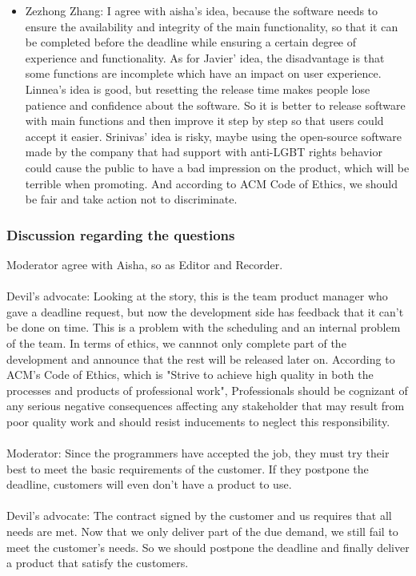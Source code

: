\begin{itemize}
  			\item Zezhong Zhang: I agree with aisha's idea, because the software needs to ensure the availability and integrity of the main functionality, so that it can be completed before the deadline while ensuring a certain degree of experience and functionality. As for Javier' idea, the disadvantage is that some functions are incomplete which have an impact on user experience. Linnea's idea is good, but resetting the release time makes people lose patience and confidence about the software. So it is better to release software with main functions and then improve it step by step so that users could accept it easier. Srinivas' idea is risky, maybe using the open-source software made by the company that had support with anti-LGBT rights behavior could cause the public to have a bad impression on the product, which will be terrible when promoting. And according to ACM Code of Ethics, we should be fair and take action not to discriminate.
		\end{itemize}
		\subsubsection{Discussion regarding the questions}
        Moderator agree with Aisha, so as Editor and Recorder.\\\\
        Devil’s advocate: Looking at the story, this is the team product manager who gave a deadline request, but now the development side has feedback that it can't be done on time. This is a problem with the scheduling and an internal problem of the team. In terms of ethics, we cannnot only complete part of the development and announce that the rest will be released later on. According to ACM’s Code of Ethics, which is "Strive to achieve high quality in both the processes and products of professional work", Professionals should be cognizant of any serious negative consequences affecting any stakeholder that may result from poor quality work and should resist inducements to neglect this responsibility.\\\\
        Moderator: Since the programmers have accepted the job, they must try their best to meet the basic requirements of the customer. If they postpone the deadline, customers will even don't have a product to use.\\\\
        Devil’s advocate: The contract signed by the customer and us requires that all needs are met. Now that we only deliver part of the due demand, we still fail to meet the customer's needs. So we should postpone the deadline and finally deliver a product that satisfy the customers.
        
